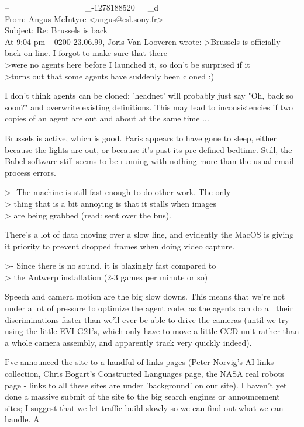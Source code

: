\begin{mail}
--============\_-1278188520==\_d============\\
From: Angus McIntyre <angus@csl.sony.fr>\\
Subject: Re: Brussels is back\\

At 9:04 pm +0200 23.06.99, Joris Van Looveren wrote:
>Brussels is officially back on line. I forgot to make sure that there
\\>were no agents here before I launched it, so don't be surprised if it
\\>turns out that some agents have suddenly been cloned :)

I don't think agents can be cloned; 'headnet' will probably just 
say "Oh, back so soon?" and overwrite existing definitions. This 
may lead to inconsistencies if two copies of an agent are out 
and about at the same time ...

Brussels is active, which is good. Paris appears to have gone 
to sleep, either because the lights are out, or because it's 
past its pre-defined bedtime. Still, the Babel software still 
seems to be running with nothing more than the usual email process errors.

>- The machine is still fast enough to do other work. The only
\\>  thing that is a bit annoying is that it stalls when images
\\>  are being grabbed (read: sent over the bus).

There's a lot of data moving over a slow line, and evidently 
the MacOS is giving it priority to prevent dropped frames 
when doing video capture.

>- Since there is no sound, it is blazingly fast compared to
\\>  the Antwerp installation (2-3 games per minute or so)

Speech and camera motion are the big slow downs. This means that 
we're not under a lot of pressure to optimize the agent code, as 
the agents can do all their discriminations faster than we'll 
ever be able to drive the cameras (until we try using the little 
EVI-G21's, which only have to move a little CCD unit rather than 
a whole camera assembly, and apparently track very quickly indeed).

I've announced the site to a handful of links pages (Peter Norvig's 
AI links collection, Chris Bogart's Constructed Languages page, the 
NASA real robots page - links to all these sites are under 
'background' on our site). I haven't yet done a massive submit of 
the site to the big search engines or announcement sites; I suggest 
that we let traffic build slowly so we can find out what we can handle.
	A
\end{mail}


